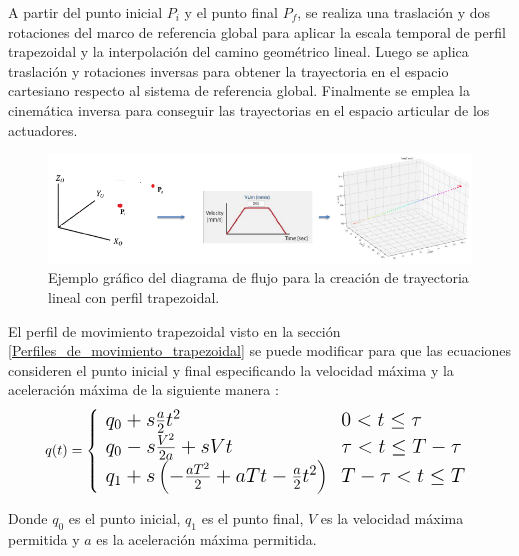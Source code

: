     A partir del punto inicial $P_i$ y el punto final $P_f$, se realiza una traslación y dos rotaciones del marco de referencia global para aplicar la escala temporal de perfil trapezoidal y la interpolación del camino geométrico lineal. Luego se aplica traslación y rotaciones inversas para obtener la trayectoria en el espacio cartesiano respecto al sistema de referencia global. Finalmente se emplea la cinemática inversa para conseguir las trayectorias en el espacio articular de los actuadores.     
    
         \begin{figure}[htb]
            \centering
            \includegraphics[width=0.9\linewidth]{Main/Chapter6/Images6/cap6_trayectory_1.png}
            \caption{Ejemplo gráfico del diagrama de flujo para la creación de trayectoria lineal con perfil trapezoidal.}
            \label{f:cap6_trayectory_5}
        \end{figure}    
    \newpage
    
    \newpage
    
    El perfil de movimiento trapezoidal visto en la sección \eqref{Perfiles_de_movimiento_trapezoidal} se puede modificar para que las ecuaciones consideren el punto inicial y final especificando la velocidad máxima y la aceleración máxima de la siguiente manera \cite{tray_trape}:
        \begin{equation}
        \Large
            q(t) = \left\lbrace
                \begin{array}{ll}
                q_0 + s\frac{a}{2}t^2&   0< t \leq \tau\\
                q_0 - s\frac{V^2}{2a}+sVt &  \tau< t \leq T- \tau\\
                q_1 + s \left( -\frac{aT^2}{2}+aTt-\frac{a}{2}t^2 \right) &  T- \tau< t \leq T\\
            \end{array}
            \right.
            \label{eq:cap6_tray_1}
        \end{equation}

    Donde $q_0$ es el punto inicial, $q_1$ es el punto final, $V$ es la velocidad máxima permitida y $a$ es la aceleración máxima permitida.



